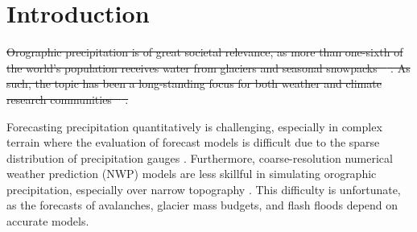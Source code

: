 \documentclass{ametsocV5}
\providecommand{\DIFdel}[1]{{\protect\color{red}\sout{#1}}}                      %
\providecommand{\DIFdelbegin}{} %
\providecommand{\DIFdelend}{} %
\newcommand{\DIFscaledelfig}{0.5}
\newlength{\DIFdelgraphicswidth} %
\newlength{\DIFdelgraphicsheight} %
\newcommand{\DIFdelincludegraphics}[2][]{%
\sbox{\DIFdelgraphicsbox}{\DIFOincludegraphics[#1]{#2}}%
\settoboxwidth{\DIFdelgraphicswidth}{\DIFdelgraphicsbox} %
\settoboxtotalheight{\DIFdelgraphicsheight}{\DIFdelgraphicsbox} %
\scalebox{\DIFscaledelfig}{%
\parbox[b]{\DIFdelgraphicswidth}{\usebox{\DIFdelgraphicsbox}\\[-\baselineskip] \rule{\DIFdelgraphicswidth}{0em}}\llap{\resizebox{\DIFdelgraphicswidth}{\DIFdelgraphicsheight}{%
\setlength{\unitlength}{\DIFdelgraphicswidth}%
\begin{picture}(1,1)%
\thicklines\linethickness{2pt} %
{\color[rgb]{1,0,0}\put(0,0){\framebox(1,1){}}}%
{\color[rgb]{1,0,0}\put(0,0){\line( 1,1){1}}}%
{\color[rgb]{1,0,0}\put(0,1){\line(1,-1){1}}}%
\end{picture}%
}\hspace*{3pt}}} %
} %
\DeclareRobustCommand{\DIFdelbegin}{\DIFOdelbegin \let\includegraphics\DIFdelincludegraphics} %
\DeclareRobustCommand{\DIFdelend}{\DIFOaddend \let\includegraphics\DIFOincludegraphics} %
\begin{document}







\section{Introduction}
    \DIFdelbegin \DIFdel{Orographic precipitation is of great societal relevance, as more than one-sixth of the world's population receives water from glaciers and seasonal snowpacks \mbox{%
\citep{barnett_potential_2005}}\hspace{0pt}%
. As such, the topic has been a long-standing focus for both weather and climate research communities \mbox{%
\citep{stoelinga_improvement_2003,schar_orographic_2005,ranzi_hydrological_2007}}\hspace{0pt}%
.
    }%

\DIFdelend Forecasting precipitation quantitatively is challenging, especially in complex terrain where the evaluation of forecast models is difficult due to the sparse distribution of precipitation gauges \citep{barstad_evaluation_2005}. Furthermore, coarse-resolution numerical weather prediction (NWP) models are less skillful in simulating orographic precipitation, especially over narrow topography \citep{gowan_validation_2018}. This difficulty is unfortunate, as the forecasts of avalanches, glacier mass budgets, and flash floods depend on accurate models. 
\end{document}
